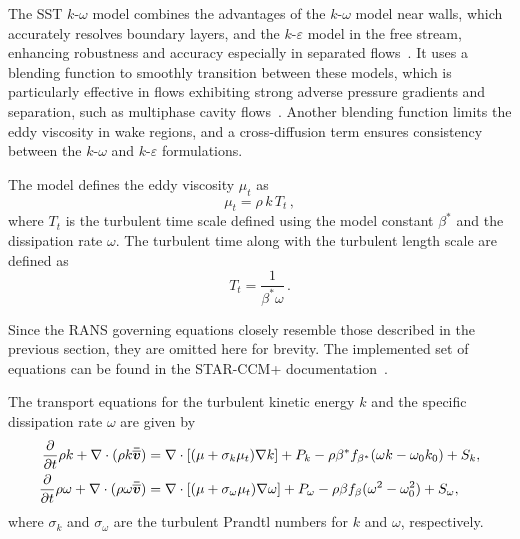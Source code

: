 The SST \(k\)-\(\omega\) model combines the advantages of the \(k\)-\(\omega\) model near 
 walls, which accurately resolves boundary layers, and the \(k\)-\(\varepsilon\) model in the free 
 stream, enhancing robustness and accuracy especially in separated flows~\cite{wilcoxTurbulenceModelingCFD2006}.
 It uses a blending function to smoothly transition between these models, which is 
 particularly effective in flows exhibiting strong adverse pressure gradients and separation, 
 such as multiphase cavity flows~\cite{Menter1994}. Another blending function limits 
 the eddy viscosity in wake regions, and a cross-diffusion term ensures consistency 
 between the \(k\)-\(\omega\) and \(k\)-\(\varepsilon\) formulations. %


The model defines the eddy viscosity \(\mu_t\) as
\begin{equation}\label{eq:turb_visc}
  \mu_t = \rho\, k\, T_t\,,
\end{equation}
where \(T_t\) is the turbulent time scale defined using the model constant \(\beta^*\) and the 
 dissipation rate \(\omega\). The turbulent time along with the turbulent length scale are defined as
\begin{equation}
  T_t = \frac{1}{\beta^* \omega}\,.
\end{equation} %

Since the RANS governing equations closely resemble those described in the previous section, 
they are omitted here for brevity. The implemented set of equations can be found in the STAR-CCM+ documentation~\cite{star-ccm+}.

The transport equations for the turbulent kinetic energy \(k\) and the 
specific dissipation rate \(\omega\) are given by
 \begin{subequations}\label{eq:turbs-kw}
\begin{align}
    \displaystyle\frac{\partial{}}{\partial{t}} \rho k  + \nabla \cdot (\rho k \bm{\bar{\overline{v}}}) &= \nabla \cdot \left[(\mu + \sigma_{k} \mu_{t}) \nabla k\right] + P_k
        - \rho \beta^{*} f_{\beta^{*}} (\omega k - \omega_0 k_0) + S_k,\\
    \displaystyle\frac{\partial{}}{\partial{t}} \rho \omega + \nabla \cdot (\rho \omega \bm{\bar{\overline{v}}}) & = \nabla \cdot \left[(\mu + \sigma_{\omega} \mu_t) \nabla \omega\right] + P_{\omega}
        - \rho \beta f_{\beta}(\omega^{2} - \omega_{0}^{2}) + S_{\omega},
\end{align} 
 \end{subequations}
where \(\sigma_k\) and \(\sigma_\omega\) are the turbulent Prandtl numbers for \(k\) and \(\omega\), respectively. %




